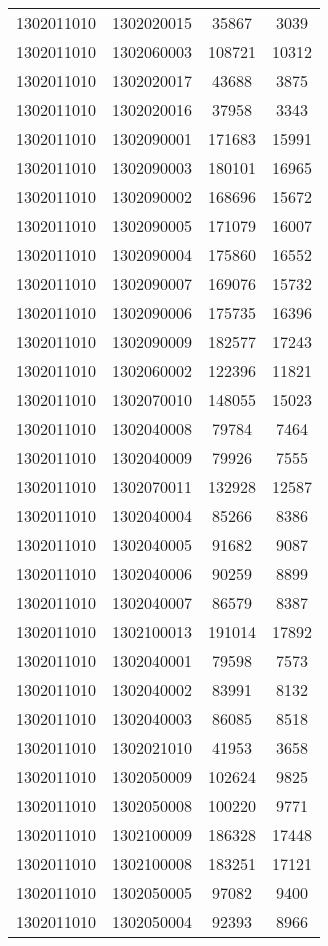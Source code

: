 \begin{longtable}{llcc}
1302011010 & 1302020015 & 35867 & 3039\\
1302011010 & 1302060003 & 108721 & 10312\\
1302011010 & 1302020017 & 43688 & 3875\\
1302011010 & 1302020016 & 37958 & 3343\\
1302011010 & 1302090001 & 171683 & 15991\\
1302011010 & 1302090003 & 180101 & 16965\\
1302011010 & 1302090002 & 168696 & 15672\\
1302011010 & 1302090005 & 171079 & 16007\\
1302011010 & 1302090004 & 175860 & 16552\\
1302011010 & 1302090007 & 169076 & 15732\\
1302011010 & 1302090006 & 175735 & 16396\\
1302011010 & 1302090009 & 182577 & 17243\\
1302011010 & 1302060002 & 122396 & 11821\\
1302011010 & 1302070010 & 148055 & 15023\\
1302011010 & 1302040008 & 79784 & 7464\\
1302011010 & 1302040009 & 79926 & 7555\\
1302011010 & 1302070011 & 132928 & 12587\\
1302011010 & 1302040004 & 85266 & 8386\\
1302011010 & 1302040005 & 91682 & 9087\\
1302011010 & 1302040006 & 90259 & 8899\\
1302011010 & 1302040007 & 86579 & 8387\\
1302011010 & 1302100013 & 191014 & 17892\\
1302011010 & 1302040001 & 79598 & 7573\\
1302011010 & 1302040002 & 83991 & 8132\\
1302011010 & 1302040003 & 86085 & 8518\\
1302011010 & 1302021010 & 41953 & 3658\\
1302011010 & 1302050009 & 102624 & 9825\\
1302011010 & 1302050008 & 100220 & 9771\\
1302011010 & 1302100009 & 186328 & 17448\\
1302011010 & 1302100008 & 183251 & 17121\\
1302011010 & 1302050005 & 97082 & 9400\\
1302011010 & 1302050004 & 92393 & 8966\\

\end{longtable}
